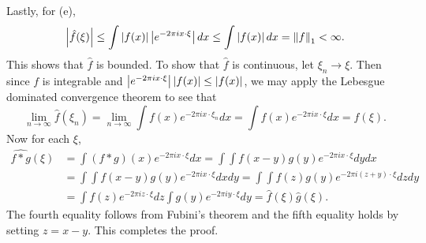 \begin{pf}
    Lastly, for (e), 
    \begin{equation*}
        \left\lvert {\hat{f}(\xi)} \right\rvert \leq \int \left\lvert {f(x)} \right\rvert\left\lvert {e^{-2\pi i x\cdot\xi}} \right\rvert dx 
        \leq \int \left\lvert {f(x)} \right\rvert dx = \left\lVert {f} \right\rVert_1<\infty.
    \end{equation*}
    This shows that $\hat{f}$ is bounded. To show that $\hat{f}$ is continuous, 
    let $\xi_n\to\xi$. Then since $f$ is integrable and 
    $\left\lvert {e^{-2\pi i x\cdot\xi}} \right\rvert\left\lvert {f(x)} \right\rvert\leq \left\lvert {f(x)} \right\rvert$, we may apply 
    the Lebesgue dominated convergence theorem to see that 
    \begin{equation*}
        \lim_{n\to\infty} \hat{f}(\xi_n) = \lim_{n\to\infty} \int f(x)e^{-2\pi i x\cdot\xi_n}dx 
        = \int f(x)e^{-2\pi i x\cdot\xi}dx = \hat{f}(\xi).
    \end{equation*}
    Now for each $\xi$, 
    \begin{equation*}
        \begin{split}
            \widehat{f*g}(\xi) &= \int (f*g)(x)e^{-2\pi i x\cdot\xi}dx 
            = \int\int f(x-y)g(y)e^{-2\pi i x\cdot\xi}dydx \\ 
            &= \int\int f(x-y)g(y)e^{-2\pi i x\cdot\xi}dxdy 
            = \int\int f(z)g(y)e^{-2\pi i (z+y)\cdot\xi}dzdy \\ 
            &= \int f(z)e^{-2\pi i z\cdot\xi}dz\int g(y)e^{-2\pi i y\cdot\xi}dy 
            = \hat{f}(\xi)\hat{g}(\xi).
        \end{split}
    \end{equation*}
    The fourth equality follows from Fubini's theorem and the fifth equality 
    holds by setting $z=x-y$. This completes the proof.
\end{pf}

